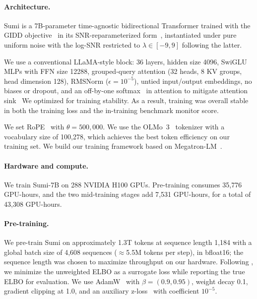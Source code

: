 \documentclass[11pt, a4paper]{style}
\begin{document}
\paragraph{Architecture.}
Sumi is a 7B-parameter time-agnostic bidirectional Transformer trained with the GIDD objective~\citep{rutte2025gidd} in its SNR-reparameterized form~\citep{rutte2026scaling}, instantiated under pure uniform noise with the log-SNR restricted to $\lambda \in [-9, 9]$ following the latter.

We use a conventional LLaMA-style block: 36 layers, hidden size 4096, SwiGLU MLPs with FFN size 12288, grouped-query attention (32 heads, 8 KV groups, head dimension 128), RMSNorm ($\epsilon = 10^{-5}$), untied input/output embeddings, no biases or dropout, and an off-by-one softmax~\citep{miller2023offbyone} in attention to mitigate attention sink~\citep{bondarenko2023quantizable, gu2025attention, xiao2024streamingllm}
We optimized for training stability. As a result, training was overall stable in both the training loss and the in-training benchmark monitor score.

We set RoPE~\citep{su2024rope} with $\theta = 500{,}000$.
We use the OLMo~3~\citep{olmo2025olmo3} tokenizer with a vocabulary size of 100{,}278, which achieves the best token efficiency on our training set.
We build our training framework based on Megatron-LM~\citep{megatron-lm}.


\paragraph{Hardware and compute.}
We train Sumi-7B on 288 NVIDIA H100 GPUs. Pre-training consumes 35{,}776 GPU-hours, and the two mid-training stages add 7{,}531 GPU-hours, for a total of 43{,}308 GPU-hours.

\paragraph{Pre-training.}
We pre-train Sumi on approximately 1.3T tokens at sequence length 1{,}184 with a global batch size of 4{,}608 sequences ($\approx$5.5M tokens per step), in bfloat16; the sequence length was chosen to maximize throughput on our hardware. 
Following \citet{rutte2026scaling}, we minimize the unweighted ELBO as a surrogate loss while reporting the true ELBO for evaluation.
We use AdamW~\citep{loshchilov2018decoupled} with $\beta = (0.9, 0.95)$, weight decay 0.1, gradient clipping at 1.0, and an auxiliary z-loss~\citep{3648699.3648939} with coefficient $10^{-5}$.
\end{document}
